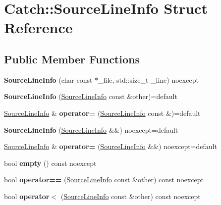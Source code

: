 \hypertarget{structCatch_1_1SourceLineInfo}{}\section{Catch\+::Source\+Line\+Info Struct Reference}
\label{structCatch_1_1SourceLineInfo}
\subsection*{Public Member Functions}
\begin{DoxyCompactItemize}
\item 
\mbox{\label{structCatch_1_1SourceLineInfo_a48510b82a39a042ab370ed143dd30c10}} 
{\bfseries Source\+Line\+Info} (char const $\ast$\+\_\+file, std\+::size\+\_\+t \+\_\+line) noexcept
\item 
\mbox{\label{structCatch_1_1SourceLineInfo_a7c44c9986c33a9cf842b791374332d41}} 
{\bfseries Source\+Line\+Info} (\mbox{\hyperlink{structCatch_1_1SourceLineInfo}{Source\+Line\+Info}} const \&other)=default
\item 
\mbox{\label{structCatch_1_1SourceLineInfo_a1a6cfc0197357ef4e329bb256aa8a354}} 
\mbox{\hyperlink{structCatch_1_1SourceLineInfo}{Source\+Line\+Info}} \& {\bfseries operator=} (\mbox{\hyperlink{structCatch_1_1SourceLineInfo}{Source\+Line\+Info}} const \&)=default
\item 
\mbox{\label{structCatch_1_1SourceLineInfo_a5ea6179645457b8ec961aec9ca4c5588}} 
{\bfseries Source\+Line\+Info} (\mbox{\hyperlink{structCatch_1_1SourceLineInfo}{Source\+Line\+Info}} \&\&) noexcept=default
\item 
\mbox{\label{structCatch_1_1SourceLineInfo_ab8469b89d86bdd69b6b9f2b610600258}} 
\mbox{\hyperlink{structCatch_1_1SourceLineInfo}{Source\+Line\+Info}} \& {\bfseries operator=} (\mbox{\hyperlink{structCatch_1_1SourceLineInfo}{Source\+Line\+Info}} \&\&) noexcept=default
\item 
\mbox{\label{structCatch_1_1SourceLineInfo_a10a5b5b7dff82971879c2eb8d83f9b3b}} 
bool {\bfseries empty} () const noexcept
\item 
\mbox{\label{structCatch_1_1SourceLineInfo_af07e4fdeddf8409b91e4f842f6264cf8}} 
bool {\bfseries operator==} (\mbox{\hyperlink{structCatch_1_1SourceLineInfo}{Source\+Line\+Info}} const \&other) const noexcept
\item 
\mbox{\label{structCatch_1_1SourceLineInfo_af77415416919d2d6030b4be085b92f7a}} 
bool {\bfseries operator$<$} (\mbox{\hyperlink{structCatch_1_1SourceLineInfo}{Source\+Line\+Info}} const \&other) const noexcept
\end{DoxyCompactItemize}
